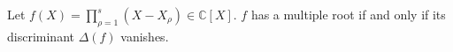 Let $f(X) = \prod_{\rho=1}^{s} (X - X_\rho) \in \mathbb{C}[X]$. $f$ has a multiple root if and only if its discriminant $\Delta(f)$ vanishes.
